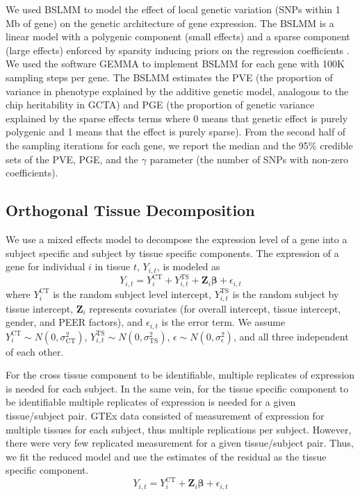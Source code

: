 \documentclass[10pt,letterpaper]{article}
\begin{document}
We used BSLMM \cite{Zhou_2013} to model the effect of local genetic variation
(SNPs within 1 Mb of gene) on the genetic architecture of gene
expression. The BSLMM is a linear model with a polygenic component (small effects) and a sparse component (large effects)
enforced by sparsity inducing priors on the
regression coefficients \cite{Zhou_2013}. We used the software GEMMA \cite{Zhou_2012} to
implement BSLMM for each gene %
with 100K sampling steps per gene.
 The BSLMM estimates the PVE (the proportion of variance in
phenotype explained by the additive genetic model, analogous to the chip heritability in GCTA) and PGE (the proportion of genetic variance explained by the sparse effects terms where 0 means that genetic effect is purely polygenic and 1 means that the effect is purely sparse). From the second half of the sampling iterations for each gene, we report the median and the 95\% credible sets of the
PVE, PGE, and the \textbar{}\(\gamma\)\textbar{} parameter (the number of SNPs with non-zero coefficients).

\subsection*{Orthogonal Tissue Decomposition}\label{orthogonal-tissue-decomposition}

We use a mixed effects model to decompose the expression level of a gene into a subject specific and subject by tissue specific components. The expression of a gene for individual $i$ in tissue $t$, $Y_{i,t}$, is modeled as
%
\[Y_{i,t} =  Y_{i}^{\text{CT}}   + Y_{i,t}^{\text{TS}} + \mathbf{Z}_i \boldsymbol{\beta} + \epsilon_{i,t}  \] 
%
where $Y_{i}^{\text{CT}}$ is the random subject level intercept,  $Y_{i,t}^{\text{TS}} $ is the random subject by tissue intercept, $\mathbf{Z}_i $ represents covariates (for overall intercept, tissue intercept, gender, and PEER factors), and $\epsilon_{i,t}$ is the error term. We assume $Y_{i}^{\text{CT}} \sim N(0,\sigma_{\text{CT}}^2)$, $Y_{i,t}^{\text{TS}} \sim N(0,\sigma_{\text{TS}}^2)$, $\epsilon \sim N(0,\sigma^2_{\epsilon})$, and all three independent of each other.

For the cross tissue component to be identifiable, multiple replicates of expression is needed for each subject. In the same vein, for the tissue specific component to be identifiable multiple replicates of expression is needed for a given tissue/subject pair. GTEx\cite{Ardlie_2015}  data consisted of measurement of expression for multiple tissues for each subject, thus multiple replications per subject. However, there were very few replicated measurement for a given tissue/subject pair. Thus, we fit the reduced model and use the estimates of the residual as the tissue specific component.
%
\[Y_{i,t} =  Y_{i}^{\text{CT}}   + \mathbf{Z}_i \boldsymbol{\beta} + \epsilon_{i,t}  \] 
%
\end{document}
